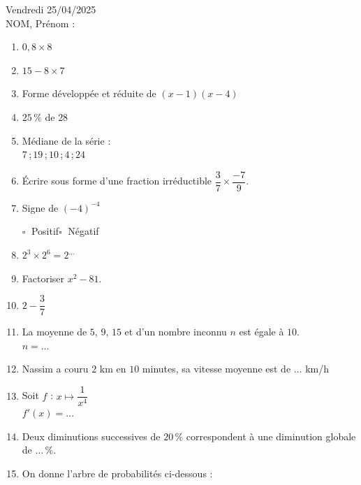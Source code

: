 \documentclass[a4paper,11pt,landscape,exos]{nsi} %
\begin{document}
\begin{multicols}{2}

\textcolor{UGLiBlue}{
        Vendredi 25/04/2025\\
        NOM, Prénom :}\\
    \maketitle


\begin{enumerate}[itemsep=.9em]
	\item $0{,}8 \times 8$ 
	\item  $15-8\times7$
	\item Forme développée et réduite de $(x-1)(x-4)$
	\item $25\,\%$ de $28$
	\item Médiane de la série :\\$7$\,;\,$19$\,;\,$10$\,;\,$4$\,;\,$24$ 
	\item Écrire sous forme d'une fraction irréductible $\dfrac{3}{7}\times \dfrac{-7}{9}$.
	\item Signe de  $(-4)^{-4}$ 
    
    	$\square\;$ Positif\qquad $\square\;$ Négatif\qquad 
	\item $2^{3}\times 2^{6}=2^{\ldots}$
	\item  Factoriser  $x^2-81$.
	\item $2-\dfrac{3}{7}$ 
	\item La moyenne de $5$, $9$, $15$ et d'un nombre inconnu $n$ est égale à $10$.\\$n=\ldots$
	\item Nassim a couru $2$ km en $10$ minutes, sa vitesse moyenne est de   $\ldots$ km/h
	\item Soit $f$ : $x\longmapsto \dfrac{1}{x^4}$\\$f'(x)=\ldots$
	\item Deux diminutions successives de  $20\,\%$ correspondent à une diminution globale de  $\ldots \,\%$.
	\item On donne l’arbre de probabilités ci-dessous :\\         \begin{tikzpicture}[baseline,scale = 0.5]


\end{tikzpicture}
\end{enumerate}
\end{multicols}
\end{document}
